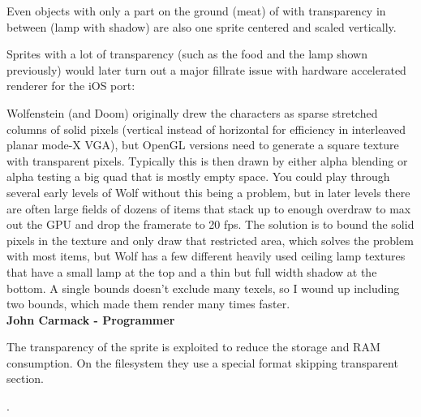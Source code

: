 Even objects with only a part on the ground (meat) of with transparency in between (lamp with shadow) are also one sprite centered and scaled vertically.\\



  \begin{minipage}{.5\textwidth} 
   \end{minipage}
  \begin{minipage}{.5\textwidth} 
   \end{minipage}

\par

 Sprites with a lot of transparency (such as the food and the lamp shown previously) would later turn out a major fillrate issue with hardware accelerated renderer for the iOS port:\\
\par
\begin{fancyquotes}
Wolfenstein (and Doom) originally drew the characters as sparse stretched columns of solid pixels (vertical instead of horizontal for efficiency in interleaved planar mode-X VGA), but OpenGL versions need to generate a square texture with transparent pixels.  Typically this is then drawn by either alpha blending or alpha testing a big quad that is mostly empty space.  You could play through several early levels of Wolf without this being a problem, but in later levels there are often large fields of dozens of items that stack up to enough overdraw to max out the GPU and drop the framerate to 20 fps.  The solution is to bound the solid pixels in the texture and only draw that restricted area, which solves the problem with most items, but Wolf has a few different heavily used ceiling lamp textures that have a small lamp at the top and a thin but full width shadow at the bottom.  A single bounds doesn't exclude many texels, so I wound up including two bounds, which made them render many times faster. 
\bigskip \\
\textbf{John Carmack - Programmer}
 \end{fancyquotes}

\par

The transparency of the sprite is exploited to reduce the storage and RAM consumption. On the filesystem they use a special format skipping transparent section.
\par
{}.\\














